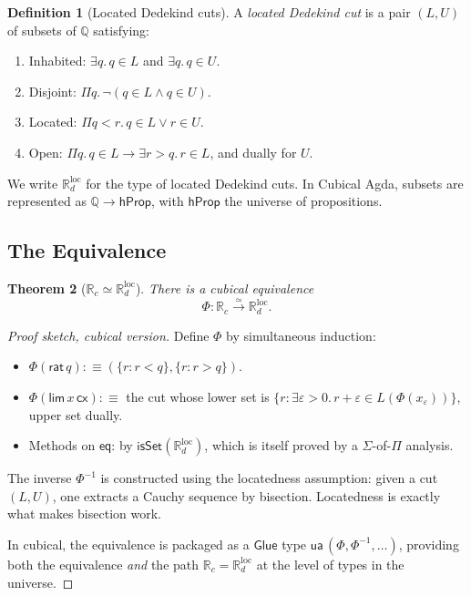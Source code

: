 \documentclass[12pt]{article}
\newtheorem{theorem}{Theorem}[section]
\theoremstyle{definition}
\newtheorem{definition}[theorem]{Definition}
\theoremstyle{remark}
\newcommand{\Q}{\mathbb{Q}}
\newcommand{\Rc}{\mathbb{R}_{c}}
\newcommand{\Rd}{\mathbb{R}_{d}}
\newcommand{\ua}{\mathsf{ua}}
\newcommand{\eqv}{\simeq}
\newcommand{\rat}{\mathsf{rat}}
\newcommand{\hlim}{\mathsf{lim}}
\newcommand{\Glue}{\mathsf{Glue}}
\begin{document}
\begin{definition}[Located Dedekind cuts]
\label{def:dedekind}
A \emph{located Dedekind cut} is a pair $(L, U)$ of subsets of $\Q$
satisfying:
\begin{enumerate}
\item Inhabited: $\exists q.\, q \in L$ and $\exists q.\, q \in U$.
\item Disjoint: $\Pi q.\, \neg (q \in L \wedge q \in U)$.
\item Located: $\Pi q < r.\, q \in L \vee r \in U$.
\item Open: $\Pi q.\, q \in L \to \exists r > q.\, r \in L$, and dually
for $U$.
\end{enumerate}
We write $\Rd^{\text{loc}}$ for the type of located Dedekind cuts. In
Cubical Agda, subsets are represented as $\Q \to \mathsf{hProp}$, with
$\mathsf{hProp}$ the universe of propositions.
\end{definition}

\subsection{The Equivalence}

\begin{theorem}[$\Rc \eqv \Rd^{\text{loc}}$]
\label{thm:dedekind}
There is a cubical equivalence
\[
\Phi : \Rc \xrightarrow{\eqv} \Rd^{\text{loc}}.
\]
\end{theorem}
\begin{proof}[Proof sketch, cubical version]
Define $\Phi$ by simultaneous induction:
\begin{itemize}
\item $\Phi(\rat\,q) :\equiv (\{r : r < q\}, \{r : r > q\})$.
\item $\Phi(\hlim\,x\,\mathsf{cx}) :\equiv$ the cut whose lower set is
$\{r : \exists \varepsilon > 0.\, r + \varepsilon \in L(\Phi(x_\varepsilon))\}$,
upper set dually.
\item Methods on $\mathsf{eq}$: by $\mathsf{isSet}(\Rd^{\text{loc}})$,
which is itself proved by a $\Sigma$-of-$\Pi$ analysis.
\end{itemize}
The inverse $\Phi^{-1}$ is constructed using the locatedness assumption:
given a cut $(L, U)$, one extracts a Cauchy sequence by bisection.
Locatedness is exactly what makes bisection work.

In cubical, the equivalence is packaged as a $\Glue$ type
$\ua\,(\Phi, \Phi^{-1}, \ldots)$, providing both the equivalence
\emph{and} the path
$\Rc = \Rd^{\text{loc}}$ at the level of types in the universe.
\end{proof}
\end{document}
